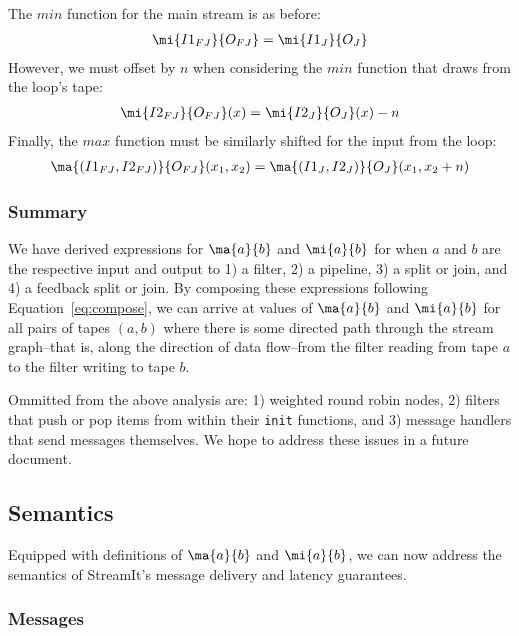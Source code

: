 The $min$ function for the main stream is as before:
\begin{align*}
\mi{I1_{FJ}}{O_{FJ}} = \mi{I1_J}{O_J} 
\end{align*}
However, we must offset by $n$ when considering the $min$ function
that draws from the loop's tape:
\begin{align*}
\mi{I2_{FJ}}{O_{FJ}}(x) = \mi{I2_J}{O_J}(x) - n
\end{align*}
Finally, the $max$ function must be similarly shifted for the input
from the loop:
\begin{align*}
\ma{(I1_{FJ}, I2_{FJ})}{O_{FJ}}(x_1, x_2) = \ma{(I1_J, I2_J)}{O_J}(x_1,
x_2 + n)
\end{align*}

\subsubsection{Summary}

We have derived expressions for $\ma{a}{b}$ and $\mi{a}{b}$ for when
$a$ and $b$ are the respective input and output to 1) a filter, 2) a
pipeline, 3) a split or join, and 4) a feedback split or join.  By
composing these expressions following Equation~\ref{eq:compose}, we
can arrive at values of $\ma{a}{b}$ and $\mi{a}{b}$ for all pairs of
tapes $(a, b)$ where there is some directed path through the stream
graph--that is, along the direction of data flow--from the filter
reading from tape $a$ to the filter writing to tape $b$.  

Ommitted from the above analysis are: 1) weighted round robin nodes,
2) filters that push or pop items from within their {\tt init}
functions, and 3) message handlers that send messages themselves.  We
hope to address these issues in a future document.

\subsection{Semantics}

Equipped with definitions of $\ma{a}{b}$ and $\mi{a}{b}$, we can now
address the semantics of StreamIt's message delivery and latency
guarantees.

\subsubsection{Messages}

